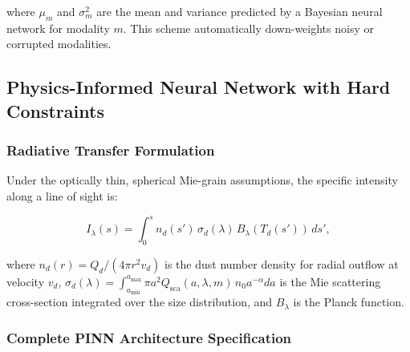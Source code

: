 \documentclass[preprint2]{aastex631}
\begin{document}
where $\mu_m$ and $\sigma_m^2$ are the mean and variance predicted by a Bayesian neural network for modality $m$. This scheme automatically down-weights noisy or corrupted modalities.

\subsection{Physics-Informed Neural Network with Hard Constraints}\label{sec:pinn}

\subsubsection{Radiative Transfer Formulation}

Under the optically thin, spherical Mie-grain assumptions, the specific intensity along a line of sight is:

\begin{equation}\label{eq:thin_dust}
I_\lambda(s) = \int_{0}^{s} n_d(s') \, \sigma_d(\lambda) \, B_\lambda(T_d(s')) \, ds',
\end{equation}

where $n_d(r) = Q_d / (4\pi r^2 v_d)$ is the dust number density for radial outflow at velocity $v_d$, $\sigma_d(\lambda) = \int_{a_{\min}}^{a_{\max}} \pi a^2 Q_{\text{sca}}(a,\lambda,m) \, n_0 a^{-\alpha} da$ is the Mie scattering cross-section integrated over the size distribution, and $B_\lambda$ is the Planck function.

\subsubsection{Complete PINN Architecture Specification}\label{sec:arch}
\end{document}
